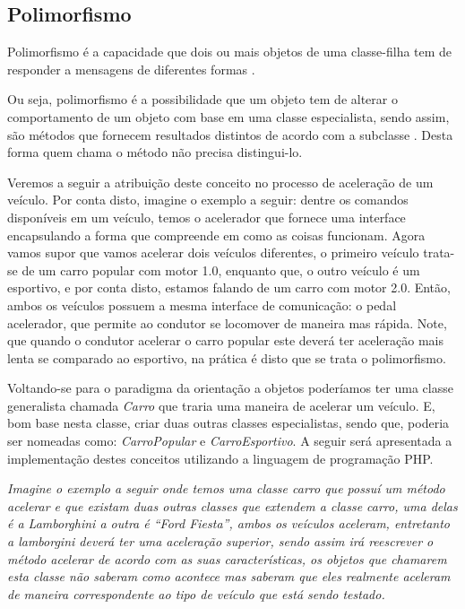 \subsection{Polimorfismo}

Polimorfismo é a capacidade que dois ou mais objetos de uma classe-filha tem  de
responder a mensagens de diferentes formas
\cite{php5ConceitosProgramacaoEIntegracaoComBancoDeDados}.

Ou seja, polimorfismo é a possibilidade que um objeto tem de alterar o
comportamento de um objeto com base em uma classe especialista, sendo assim,
são métodos que fornecem resultados distintos  de acordo com a subclasse
\cite{php5ConceitosProgramacaoEIntegracaoComBancoDeDados}. Desta forma quem
chama o método não precisa distingui-lo.

Veremos a seguir a atribuição deste conceito no processo de aceleração de um
veículo. Por conta disto, imagine o exemplo a seguir: dentre os comandos
disponíveis em um veículo, temos o acelerador que fornece uma interface
encapsulando a forma que compreende em como as coisas funcionam. Agora vamos
supor que vamos acelerar dois veículos diferentes, o primeiro veículo trata-se
de um carro popular com motor 1.0, enquanto que, o outro veículo é um
 esportivo, e por conta disto, estamos falando de um carro com motor 2.0. Então,
ambos os veículos possuem a mesma interface de comunicação: o pedal acelerador,
que permite ao condutor se locomover de maneira mas rápida. Note, que quando o
condutor acelerar o carro popular este deverá ter aceleração mais lenta se
comparado ao esportivo, na prática é disto que se trata o polimorfismo.

Voltando-se para o paradigma da orientação a objetos poderíamos ter uma classe
generalista chamada \textit{Carro} que traria uma maneira de acelerar um
veículo.  E, bom base nesta classe, criar duas outras classes especialistas, sendo que,
poderia ser nomeadas como: \textit{CarroPopular} e \textit{CarroEsportivo}.
A seguir será apresentada a implementação destes conceitos
utilizando a linguagem de programação PHP.

\textit{Imagine o exemplo a seguir onde temos uma classe carro que possuí um
método acelerar e que existam duas outras classes que extendem a classe carro, uma
delas é a Lamborghini a outra é “Ford Fiesta”, ambos os veículos
aceleram, entretanto a lamborgini deverá ter uma aceleração superior, sendo assim irá
reescrever o método acelerar de acordo com as suas características, os objetos
que chamarem esta classe não saberam como acontece mas saberam que eles
realmente  aceleram de maneira correspondente ao tipo de veículo que está sendo
testado.}
